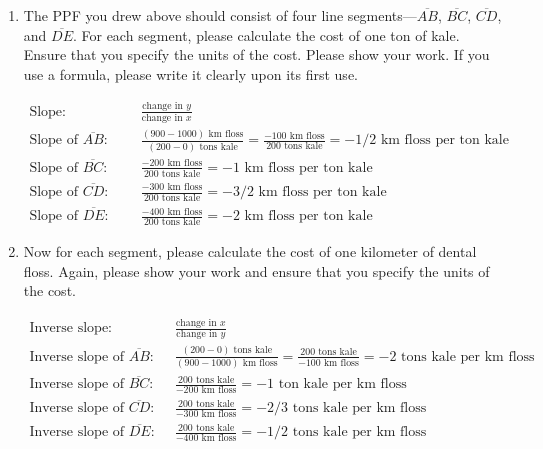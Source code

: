 \documentclass{assignment}
\begin{document}
\begin{enumerate}
\item The PPF you drew above should consist of four line segments---$\overline{AB}$, $\overline{BC}$, $\overline{CD}$, and $\overline{DE}$. For each segment, please calculate the cost of one ton of kale. Ensure that you specify the units of the cost. Please show your work. If you use a formula, please write it clearly upon its first use.
\begin{solution}
\vspace{-\baselineskip}
\begin{align*}
\text{Slope:} &&& \frac{\text{change in $y$}}{\text{change in $x$}} \\
\text{Slope of $\overline{AB}$:} &&& \frac{(900-1000)\text{ km floss}}{(200-0)\text{ tons kale}} = \frac{-100\text{ km floss}}{200\text{ tons kale}} = -1/2 \text{ km floss per ton kale} \\
\text{Slope of $\overline{BC}$:} &&& \frac{-200\text{ km floss}}{200\text{ tons kale}} = -1 \text{ km floss per ton kale} \\
\text{Slope of $\overline{CD}$:} &&& \frac{-300\text{ km floss}}{200\text{ tons kale}} = -3/2 \text{ km floss per ton kale} \\
\text{Slope of $\overline{DE}$:} &&& \frac{-400\text{ km floss}}{200\text{ tons kale}} = -2 \text{ km floss per ton kale}
\end{align*}
\end{solution}

\item Now for each segment, please calculate the cost of one kilometer of dental floss. Again, please show your work and ensure that you specify the units of the cost.
\begin{solution}
\vspace{-\baselineskip}
\begin{align*}
\text{Inverse slope:} &&& \frac{\text{change in $x$}}{\text{change in $y$}} \\
\text{Inverse slope of $\overline{AB}$:} &&& \frac{(200-0)\text{ tons kale}}{(900-1000)\text{ km floss}} = \frac{200\text{ tons kale}}{-100\text{ km floss}} = -2 \text{ tons kale per km floss} \\
\text{Inverse slope of $\overline{BC}$:} &&& \frac{200\text{ tons kale}}{-200\text{ km floss}} = -1 \text{ ton kale per km floss} \\
\text{Inverse slope of $\overline{CD}$:} &&& \frac{200\text{ tons kale}}{-300\text{ km floss}} = -2/3 \text{ tons kale per km floss} \\
\text{Inverse slope of $\overline{DE}$:} &&& \frac{200\text{ tons kale}}{-400\text{ km floss}} = -1/2 \text{ tons kale per km floss}
\end{align*}
\end{solution}


\end{enumerate}
\end{document}
